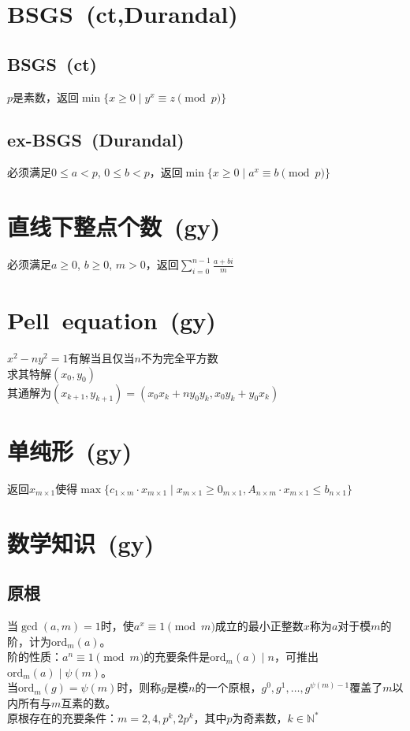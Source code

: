 \section{BSGS\ \small(ct,Durandal)}
    \subsection*{BSGS\ \small(ct)}
        $ p $是素数，返回$ \min\lbrace x \geq 0 \mid y^x \equiv z \pmod p \rbrace $
    \subsection*{ex-BSGS\ \small(Durandal)}
        必须满足$ 0 \leq a < p $, $ 0 \leq b < p $，返回$ \min\lbrace x \geq 0 \mid a^x \equiv b \pmod p\rbrace $
\section{直线下整点个数\ \small(gy)}
    必须满足$ a \geq 0 $, $ b \geq 0 $, $ m > 0 $，返回$ \sum\limits_{i=0}^{n-1} \frac{a + bi}{m} $
\section{Pell\ equation\ \small(gy)}
    $ x^2 - n y^2 = 1 $有解当且仅当$ n $不为完全平方数
    \\求其特解$ (x_0, y_0) $
    \\其通解为$ (x_{k + 1}, y_{k + 1}) = (x_0 x_k + n y_0 y_k, x_0 y_k + y_0 x_k ) $
\section{单纯形\ \small(gy)}
    返回$ x_{m \times 1} $使得$ \max \lbrace c_{1 \times m} \cdot x_{m \times 1} \mid x_{m \times 1} \geq 0_{m \times 1}, A_{n \times m} \cdot x_{m \times 1} \leq b_{n \times 1} \rbrace $
\section{数学知识\ \small(gy)}
\newcommand{\eularian}{\genfrac\langle\rangle{0pt}{2}}
\newcommand{\Eularian}{\genfrac{\langle\!\langle}{\rangle\!\rangle}{0pt}{2}}
    \subsection*{原根}
        当$ \gcd(a, m) = 1 $时，使$ a^x \equiv 1 \pmod m $成立的最小正整数$ x $称为$ a $对于模$ m $的阶，计为$ \text{ord}_m(a) $。
        \\阶的性质：$ a^n \equiv 1 \pmod m $的充要条件是$ \text{ord}_m(a) \mid n $，可推出$ \text{ord}_m(a) \mid \psi(m) $。
        \\当$ \text{ord}_m(g) = \psi(m) $时，则称$ g $是模$ n $的一个原根，$ g^0, g^1, \dots, g^{\psi(m) - 1} $覆盖了$ m $以内所有与$ m $互素的数。
        \\原根存在的充要条件：$ m = 2, 4, p^k, 2 p^k $，其中$ p $为奇素数，$ k \in \mathbb{N}^\ast $
